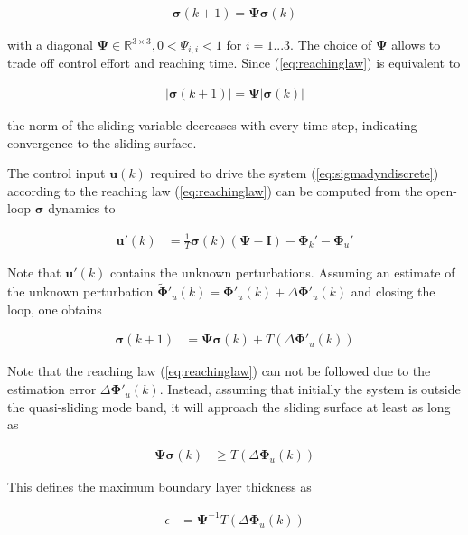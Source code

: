 \documentclass{ifacconf}
\providecommand{\mbf}[1]{\mathbf{#1}}
\begin{document}
\begin{align}
\mbf{\sigma}(k+1) = \mbf{\Psi} \mbf{\sigma}(k)
\label{eq:reachinglaw}
\end{align}


with a diagonal $\mbf{\Psi} \in \mathbb{R}^{3 \times 3}, 0 < \Psi_{i,i} < 1$ for $i=1...3$. The choice of $\mbf{\Psi}$ allows to trade off control effort and reaching time.
Since (\ref{eq:reachinglaw}) is equivalent to

\begin{align}
|\mbf{\sigma}(k+1)| = \mbf{\Psi} |\mbf{\sigma}(k)|
\end{align}

the norm of the sliding variable decreases with every time step, indicating convergence to the sliding surface.

The control input $\mbf{u}(k)$ required to drive the system (\ref{eq:sigmadyndiscrete}) according to the reaching law (\ref{eq:reachinglaw}) can be computed from the open-loop $\mbf{\sigma}$ dynamics to

\begin{align}
\mbf{u}'(k) &= \frac{1}{T}\mbf{\sigma}(k)(\mbf{\Psi} - \mbf{I}) - \mbf{\Phi}_k' - \mbf{\Phi}_u'
\end{align}

Note that $\mbf{u}'(k)$ contains the unknown perturbations. Assuming an estimate of the unknown perturbation $\tilde{\mbf{\Phi}}'_u(k) = \mbf{\Phi}'_u(k) + \Delta \mbf{\Phi}'_u(k)$ and closing the loop, one obtains

\begin{align}
\mbf{\sigma}(k+1) &= \mbf{\Psi} \mbf{\sigma}(k) +
T (\Delta \mbf{\Phi}'_u(k))
\end{align}

Note that the reaching law (\ref{eq:reachinglaw}) can not be followed due to the estimation error $\Delta \mbf{\Phi}'_u(k)$. Instead, assuming that initially the system is outside the quasi-sliding mode band, it will approach the sliding surface at least as long as

\begin{align}
\mbf{\Psi} \mbf{\sigma}(k) & \geq T (\Delta \mbf{\Phi}_u(k))
\end{align}

This defines the maximum boundary layer thickness as

\begin{align}
\epsilon &=
\mbf{\Psi}^{-1} T (\Delta \mbf{\Phi}_u(k))
\label{eq:achievableepsilon}
\end{align}
\end{document}
